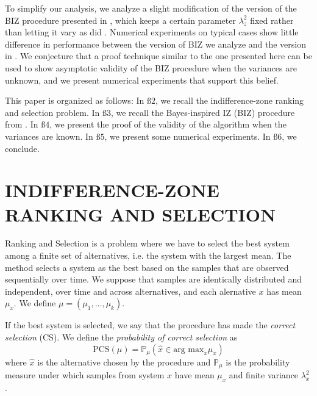 \documentclass{wscpaperproc}
\theoremstyle{wsc}
\begin{document}
To simplify our analysis, we analyze a slight modification of the version of the BIZ procedure presented in \cite{Frazier:BIZ}, which keeps a certain parameter $\lambda^2_z$ fixed rather than letting it vary as did \cite{Frazier:BIZ}.  Numerical experiments on typical cases show little difference in performance between the version of BIZ we analyze and the version in \cite{Frazier:BIZ}.
We conjecture that a proof technique similar to the one presented here can be used to show asymptotic validity of the BIZ procedure when
the variances are unknown, and we present numerical experiments that support this belief. 



This paper is organized as follows: In $\text{ß}2$, we recall the
indifference-zone ranking and selection problem. In $\text{ß}3$,
we recall the Bayes-inspired IZ (BIZ) procedure from . In $\text{ß}4$,
we present the proof of the validity of the algorithm when the variances
are known. In $\text{ß}5$, we present some numerical experiments. 
In $\text{ß}6$, we conclude.



\section{INDIFFERENCE-ZONE RANKING AND SELECTION}

Ranking and Selection is a problem where we have to select the best system
among a finite set of alternatives, i.e. the system with the largest
mean. The method selects a system as the best based on the samples
that are observed sequentially over time. We suppose that samples
are identically distributed and independent, over time and across alternatives, and
each alernative $x$ has mean $\mu_{x}$. We define $\mu=(\mu_{1},\ldots,\mu_{k})$.

If the best system is selected, we say that the procedure has made the \emph{correct selection}
(CS). We define the \emph{probability of correct selection} as 
\[
\mbox{PCS}\left(\mu\right)=\mathbb{P}_{\mu}\left(\hat{x}\in\mbox{arg max}_{x}\mu_{x}\right)
\]
where $\hat{x}$ is the alternative chosen by the procedure and $\mathbb{P}_{\mu}$
is the probability measure under which samples from system $x$ have
mean $\mu_{x}$ and finite variance $\lambda_{x}^{2}$.
\end{document}
